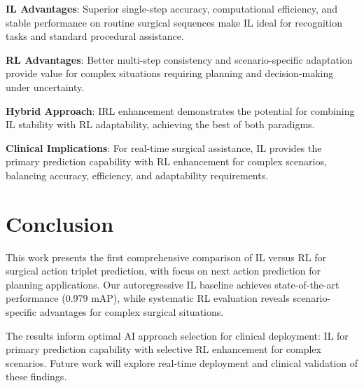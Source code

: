 \documentclass[runningheads]{llncs}
\begin{document}
\textbf{IL Advantages}: Superior single-step accuracy, computational efficiency, and stable performance on routine surgical sequences make IL ideal for recognition tasks and standard procedural assistance.

\textbf{RL Advantages}: Better multi-step consistency and scenario-specific adaptation provide value for complex situations requiring planning and decision-making under uncertainty.

\textbf{Hybrid Approach}: IRL enhancement demonstrates the potential for combining IL stability with RL adaptability, achieving the best of both paradigms.

\textbf{Clinical Implications}: For real-time surgical assistance, IL provides the primary prediction capability with RL enhancement for complex scenarios, balancing accuracy, efficiency, and adaptability requirements.

\section{Conclusion}

This work presents the first comprehensive comparison of IL versus RL for surgical action triplet prediction, with focus on next action prediction for planning applications. Our autoregressive IL baseline achieves state-of-the-art performance (0.979 mAP), while systematic RL evaluation reveals scenario-specific advantages for complex surgical situations.

The results inform optimal AI approach selection for clinical deployment: IL for primary prediction capability with selective RL enhancement for complex scenarios. Future work will explore real-time deployment and clinical validation of these findings.
\end{document}

